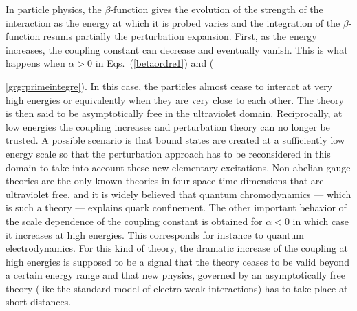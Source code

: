 \documentclass[floatfix,preprintnumbers,amsmath,amssymb,prb,12pt]{revtex4-1}
\begin{document}
{In particle physics, the $\beta$-function gives the evolution of the strength of the interaction as the energy
at which it is probed varies and the integration of the $\beta$-function resums partially the
perturbation expansion. First, as the
energy increases, the coupling constant can decrease and eventually
vanish. This is what happens when $\alpha>0$ in
Eqs.~(\ref{betaordre1}) and ({\ref{grgrprimeintegre}). In this
case, the particles almost cease to interact at very high energies
or equivalently when they are very close to each other. The theory
is then said to be asymptotically free in the ultraviolet
domain.\cite{collins84,lebellac91} Reciprocally, at low energies
the coupling increases and perturbation theory can no longer be
trusted. A possible scenario is that bound states are created at a
sufficiently low energy scale so that the perturbation approach
has to be reconsidered in this domain to take into account these
new elementary excitations. Non-abelian gauge theories are the
only known theories in four space-time dimensions that are
ultraviolet free, and it is widely believed that quantum
chromodynamics --- which is such a theory --- explains quark
confinement. The other important behavior of the scale
dependence of the coupling constant is obtained
for $\alpha<0$ in which case it increases at high energies. This 
corresponds for instance to quantum electrodynamics. For this kind of theory,
the dramatic increase of the coupling at high energies is supposed
to be a signal that the theory ceases to be valid beyond a certain
energy range and that new physics, governed by an asymptotically
free theory (like the standard model of electro-weak
interactions) has to take place at short distances. 

}}
\end{document}
